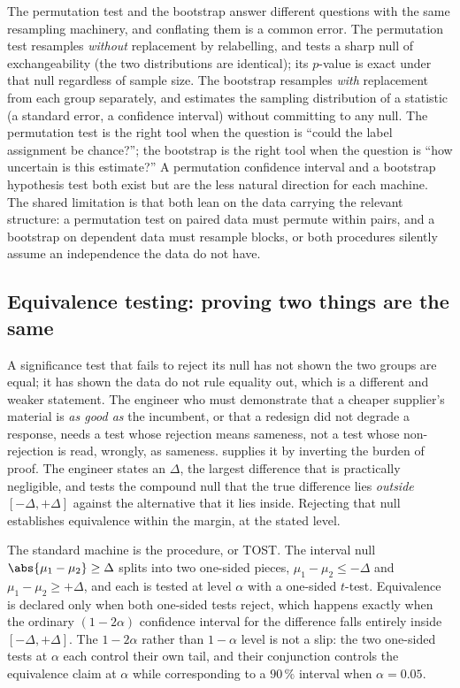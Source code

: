 \begin{mastery}
The permutation test and the bootstrap answer different questions
with the same resampling machinery, and conflating them is a common
error. The permutation test resamples \emph{without} replacement by
relabelling, and tests a sharp null of exchangeability (the two
distributions are identical); its $p$-value is exact under that null
regardless of sample size. The bootstrap resamples \emph{with}
replacement from each group separately, and estimates the sampling
distribution of a statistic (a standard error, a confidence
interval) without committing to any null. The permutation test is
the right tool when the question is ``could the label assignment be
chance?''; the bootstrap is the right tool when the question is ``how
uncertain is this estimate?'' A permutation confidence interval and a
bootstrap hypothesis test both exist but are the less natural
direction for each machine. The shared limitation is that both lean
on the data carrying the relevant structure: a permutation test on
paired data must permute within pairs, and a bootstrap on dependent
data must resample blocks, or both procedures silently assume an
independence the data do not have.
\end{mastery}

\subsection{Equivalence testing: proving two things are the same}

A significance test that fails to reject its null has not shown the
two groups are equal; it has shown the data do not rule equality out,
which is a different and weaker statement. The engineer who must
demonstrate that a cheaper supplier's material is \emph{as good as}
the incumbent, or that a redesign did not degrade a response, needs a
test whose rejection means sameness, not a test whose non-rejection is
read, wrongly, as sameness.  supplies it
by inverting the burden of proof. The engineer states an
 $\Delta$, the largest difference that is
practically negligible, and tests the compound null that the true
difference lies \emph{outside} $[-\Delta, +\Delta]$ against the
alternative that it lies inside. Rejecting that null establishes
equivalence within the margin, at the stated level.

The standard machine is the  procedure,
or TOST. The interval null $\abs{\mu_{1} - \mu_{2}} \geq \Delta$ splits
into two one-sided pieces, $\mu_{1} - \mu_{2} \leq -\Delta$ and
$\mu_{1} - \mu_{2} \geq +\Delta$, and each is tested at level $\alpha$
with a one-sided $t$-test. Equivalence is declared only when both
one-sided tests reject, which happens exactly when the ordinary
$(1 - 2\alpha)$ confidence interval for the difference falls entirely
inside $[-\Delta, +\Delta]$. The $1 - 2\alpha$ rather than $1 - \alpha$
level is not a slip: the two one-sided tests at $\alpha$ each control
their own tail, and their conjunction controls the equivalence claim
at $\alpha$ while corresponding to a $90\,\%$ interval when $\alpha =
0.05$.


